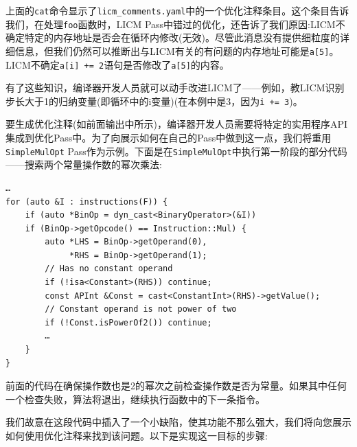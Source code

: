 上面的\texttt{cat}命令显示了\texttt{licm\_comments.yaml}中的一个优化注释条目。这个条目告诉我们，在处理\texttt{foo}函数时，LICM Pass中错过的优化，还告诉了我们原因:LICM不确定特定的内存地址是否会在循环内修改(无效)。尽管此消息没有提供细粒度的详细信息，但我们仍然可以推断出与LICM有关的有问题的内存地址可能是\texttt{a[5]}。LICM不确定\texttt{a[i] += 2}语句是否修改了\texttt{a[5]}的内容。

有了这些知识，编译器开发人员就可以动手改进LICM了——例如，教LICM识别步长大于1的归纳变量(即循环中的i变量)(在本例中是3，因为\texttt{i += 3})。

要生成优化注释(如前面输出中所示)，编译器开发人员需要将特定的实用程序API集成到优化Pass中。为了向展示如何在自己的Pass中做到这一点，我们将重用\texttt{SimpleMulOpt} Pass作为示例。下面是在\texttt{SimpleMulOpt}中执行第一阶段的部分代码——搜索两个常量操作数的幂次乘法:

\begin{lstlisting}[style=styleCXX]
…
for (auto &I : instructions(F)) {
	if (auto *BinOp = dyn_cast<BinaryOperator>(&I))
	if (BinOp->getOpcode() == Instruction::Mul) {
		auto *LHS = BinOp->getOperand(0),
		     *RHS = BinOp->getOperand(1);
		// Has no constant operand
		if (!isa<Constant>(RHS)) continue;
		const APInt &Const = cast<ConstantInt>(RHS)->getValue();
		// Constant operand is not power of two
		if (!Const.isPowerOf2()) continue;
		…
	}
}
\end{lstlisting}

前面的代码在确保操作数也是2的幂次之前检查操作数是否为常量。如果其中任何一个检查失败，算法将退出，继续执行函数中的下一条指令。

我们故意在这段代码中插入了一个小缺陷，使其功能不那么强大，我们将向您展示如何使用优化注释来找到该问题。以下是实现这一目标的步骤:

